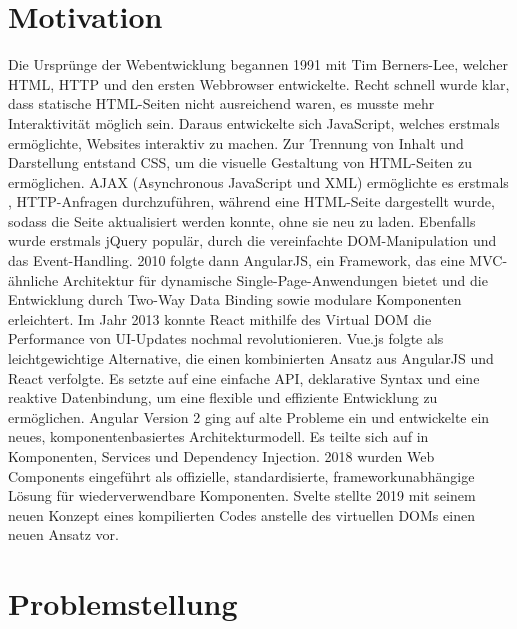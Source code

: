 \documentclass[oneside]{ausarbeitung}
\begin{document}
\section{Motivation}
\label{sec:motivation}
Die Ursprünge der Webentwicklung begannen 1991 mit Tim Berners-Lee, welcher HTML, HTTP und den ersten Webbrowser entwickelte.
Recht schnell wurde klar, dass statische HTML-Seiten nicht ausreichend waren, es musste mehr Interaktivität möglich sein. Daraus entwickelte sich JavaScript, welches erstmals ermöglichte, Websites interaktiv zu machen.
Zur Trennung von Inhalt und Darstellung entstand CSS, um die visuelle Gestaltung von HTML-Seiten zu ermöglichen.
AJAX (Asynchronous JavaScript und XML) ermöglichte es erstmals , HTTP-Anfragen durchzuführen, während eine HTML-Seite dargestellt wurde, sodass die Seite aktualisiert werden konnte, ohne sie neu zu laden.
Ebenfalls wurde erstmals jQuery populär, durch die vereinfachte DOM-Manipulation und das Event-Handling.
2010 folgte dann AngularJS, ein Framework, das eine MVC-ähnliche Architektur für dynamische Single-Page-Anwendungen bietet und die Entwicklung durch Two-Way Data Binding sowie modulare Komponenten erleichtert.
Im Jahr 2013 konnte React mithilfe des Virtual DOM die Performance von UI-Updates nochmal revolutionieren.
Vue.js folgte als leichtgewichtige Alternative, die einen kombinierten Ansatz aus AngularJS und React verfolgte. Es setzte auf eine einfache API, deklarative Syntax und eine reaktive Datenbindung, um eine flexible und effiziente Entwicklung zu ermöglichen.
Angular Version 2 ging auf alte Probleme ein und entwickelte ein neues, komponentenbasiertes Architekturmodell. Es teilte sich auf in Komponenten, Services und Dependency Injection. 
2018 wurden Web Components eingeführt als offizielle, standardisierte, frameworkunabhängige Lösung für wiederverwendbare Komponenten.
Svelte stellte 2019 mit seinem neuen Konzept eines kompilierten Codes anstelle des virtuellen DOMs einen neuen Ansatz vor.


\section{Problemstellung}
\label{sec:problemstellung}
\end{document}
